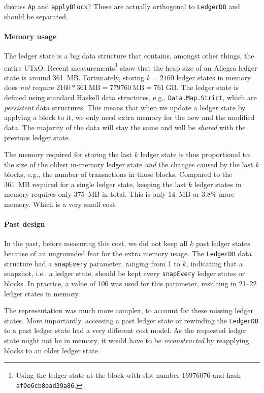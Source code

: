  discuss \lstinline!Ap! and \lstinline!applyBlock!? These are
actually orthogonal to \lstinline!LedgerDB! and should be separated.


\paragraph{Memory usage}

The ledger state is a big data structure that contains, amongst other things,
the entire UTxO. Recent measurements\footnote{Using the ledger state at the
block with slot number \num{16976076} and hash \lstinline!af0e6cb8ead39a86!.}
show that the heap size of an Allegra ledger state is around \num{361}~MB.
Fortunately, storing $k = \num{2160}$ ledger states in memory does \emph{not}
require $\num{2160} * \num{361}~\textrm{MB} = \num{779760}~\textrm{MB} =
\num{761}~\textrm{GB}$. The ledger state is defined using standard Haskell data
structures, e.g., \lstinline!Data.Map.Strict!, which are \emph{persistent} data
structures. This means that when we update a ledger state by applying a block to
it, we only need extra memory for the new and the modified data. The majority of
the data will stay the same and will be \emph{shared} with the previous ledger
state.

The memory required for storing the last $k$ ledger state is thus proportional
to: the size of the oldest in-memory ledger state \emph{and} the changes caused
by the last $k$ blocks, e.g., the number of transactions in those blocks.
Compared to the \num{361}~MB required for a single ledger state, keeping the
last $k$ ledger states in memory requires only \num{375}~MB in total. This is
only \num{14}~MB or 3.8\% more memory. Which is a very small cost.

\paragraph{Past design}

In the past, before measuring this cost, we did not keep all $k$ past ledger
states because of an ungrounded fear for the extra memory usage. The
\lstinline!LedgerDB! data structure had a \lstinline!snapEvery! parameter,
ranging from 1 to $k$, indicating that a snapshot, i.e., a ledger state, should
be kept every \lstinline!snapEvery! ledger states or blocks. In practice, a
value of 100 was used for this parameter, resulting in 21--22 ledger states in
memory.

The representation was much more complex, to account for these missing ledger
states. More importantly, accessing a past ledger state or rewinding the
\lstinline!LedgerDB! to a past ledger state had a very different cost model. As
the requested ledger state might not be in memory, it would have to be
\emph{reconstructed} by reapplying blocks to an older ledger state.

